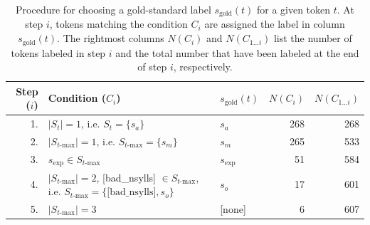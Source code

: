 		\begin{table}[tb]
		\centering
		\caption[Procedure for choosing a gold-standard label for a given token]{Procedure for choosing a gold-standard label $s_{\text{gold}}(t)$ for a given token $t$. At step $i$, tokens matching the condition $C_i$ are assigned the label in column $s_{\text{gold}}(t)$. The rightmost columns $N(C_i)$ and $N(C_{1 \dots i})$ list the number of tokens labeled in step $i$ and the total number that have been labeled at the end of step $i$, respectively.}
		
			\renewcommand{\arraystretch}{2}
			\begin{tabularx}{\textwidth}{rXlrr}
			\toprule
			Step ($i$)
			& Condition ($C_i$) 
			& $s_{\text{gold}}(t)$ 
			& $N(C_i)$ 
			& $N(C_{1 \dots i})$ 
			\\
			\midrule
			
			1.& 
			$|S_t|=1$, i.e. $S_t = \{s_a\}$
			& 
			$s_a$
			& 268 & 268 \\
			 
			2.& 
			$|S_{t\text{-max}}|=1$, i.e. $S_{t\text{-max}} = \{s_m\}$
			& 
			$s_m$ & 265 & 533 \\
			
			3.& 
			$s_{\text{exp}} \in S_{t\text{-max}}$
			& 
			$s_{\text{exp}}$ & 51 & 584 \\
			
			4.& 
			$|S_{t\text{-max}}| = 2$, \mbox{[bad\_nsylls]} $\in S_{t\text{-max}}$,
			\newline
			i.e. $S_{t\text{-max}} = \{\text{[bad\_nsylls]}, s_o\}$	
			& 
			$s_o$ & 17 & 601 \\
			
			5.& 
			$|S_{t\text{-max}}| = 3$
			&
			\mbox{[none]} & 6 & 607\\
			

\end{tabularx}
\end{table}

